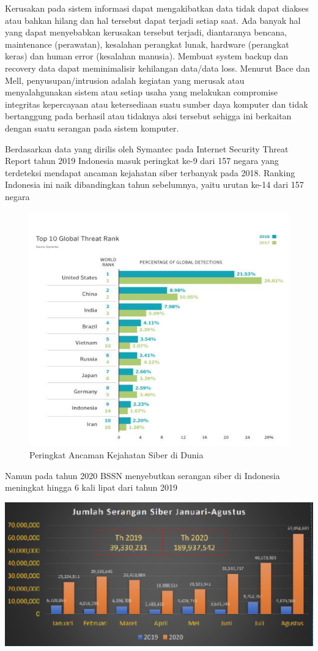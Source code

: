 \documentclass[conference]{IEEEtran}
\begin{document}
Kerusakan pada sistem informasi dapat mengakibatkan data tidak dapat diakses atau bahkan hilang dan hal tersebut dapat terjadi setiap saat. Ada banyak hal yang dapat menyebabkan kerusakan tersebut terjadi, diantaranya bencana, maintenance (perawatan), kesalahan perangkat lunak, hardware (perangkat keras) dan human error (kesalahan manusia). Membuat system backup dan recovery data dapat meminimalisir kehilangan data/data loss. Menurut Bace dan Mell, penyusupan/intrusion adalah kegiatan yang merusak atau menyalahgunakan sistem atau setiap usaha yang melakukan compromise integritas kepercayaan atau ketersediaan suatu sumber daya komputer dan tidak bertanggung pada berhasil atau tidaknya aksi tersebut sehigga ini berkaitan dengan suatu serangan pada sistem komputer.

Berdasarkan data yang dirilis oleh Symantec pada Internet Security Threat Report tahun 2019 Indonesia masuk peringkat ke-9 dari 157 negara yang terdeteksi mendapat ancaman kejahatan siber terbanyak pada 2018. Ranking Indonesia ini naik dibandingkan tahun sebelumnya, yaitu urutan ke-14 dari 157 negara

\begin{figure}
\centering
\includegraphics[width=.4\textwidth]{picture/Gambar 1.1.PNG}
\caption{Peringkat Ancaman Kejahatan Siber di Dunia}
\end{figure}

Namun pada tahun 2020 BSSN menyebutkan serangan siber di Indonesia meningkat hingga 6 kali lipat dari tahun 2019

\begin{center}
\includegraphics[width=.4\textwidth]{picture/Gambar 1.2.PNG}

\end{center}
\end{document}
